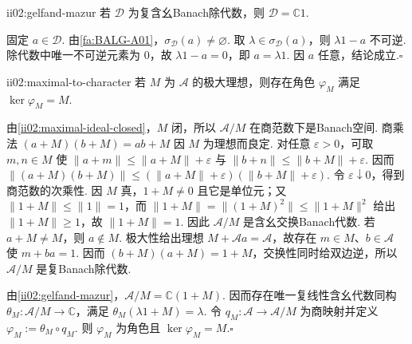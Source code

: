 \begin{FATheorem}{ii02:gelfand-mazur}
若 \(\displaystyle \mathcal D\) 为复含幺Banach除代数，则 \(\displaystyle\mathcal D=\mathbb C1\).
\end{FATheorem}

\begin{FAProof}
固定 \(\displaystyle a\in\mathcal D\). 由\autoref{fa:BALG-A01}，\(\displaystyle\sigma_{\mathcal D}(a)\neq\varnothing\). 取 \(\displaystyle\lambda\in\sigma_{\mathcal D}(a)\)，则 \(\displaystyle\lambda1-a\) 不可逆. 除代数中唯一不可逆元素为 \(\displaystyle0\)，故 \(\displaystyle\lambda1-a=0\)，即 \(\displaystyle a=\lambda1\). 因 \(\displaystyle a\) 任意，结论成立.\hfill\(\square\)
\end{FAProof}

\begin{FAProposition}[B][极大理想产生角色]{ii02:maximal-to-character}
若 \(\displaystyle M\) 为 \(\displaystyle\mathcal A\) 的极大理想，则存在角色 \(\displaystyle\varphi_M\) 满足 \(\displaystyle\ker\varphi_M=M\).
\end{FAProposition}

\begin{FAProof}
由\autoref{ii02:maximal-ideal-closed}，\(\displaystyle M\) 闭，所以 \(\displaystyle\mathcal A/M\) 在商范数下是Banach空间. 商乘法 \(\displaystyle(a+M)(b+M)=ab+M\) 因 \(\displaystyle M\) 为理想而良定. 对任意 \(\displaystyle\varepsilon>0\)，可取 \(\displaystyle m,n\in M\) 使 \(\displaystyle\|a+m\|\leqslant\|a+M\|+\varepsilon\) 与 \(\displaystyle\|b+n\|\leqslant\|b+M\|+\varepsilon\). 因而
\(\displaystyle \|(a+M)(b+M)\| \leqslant (\|a+M\|+\varepsilon)(\|b+M\|+\varepsilon).\)
令 \(\displaystyle\varepsilon\downarrow0\)，得到商范数的次乘性. 因 \(\displaystyle M\) 真，\(\displaystyle1+M\neq0\) 且它是单位元；又 \(\displaystyle\|1+M\|\leqslant\|1\|=1\)，而 \(\displaystyle\|1+M\|=\|(1+M)^2\|\leqslant\|1+M\|^2\) 给出 \(\displaystyle\|1+M\|\geqslant1\)，故 \(\displaystyle\|1+M\|=1\). 因此 \(\displaystyle\mathcal A/M\) 是含幺交换Banach代数. 若 \(\displaystyle a+M\neq M\)，则 \(\displaystyle a\notin M\). 极大性给出理想 \(\displaystyle M+\mathcal Aa=\mathcal A\)，故存在 \(\displaystyle m\in M\)、\(\displaystyle b\in\mathcal A\) 使 \(\displaystyle m+ba=1\). 因而 \(\displaystyle(b+M)(a+M)=1+M\)，交换性同时给双边逆，所以 \(\displaystyle\mathcal A/M\) 是复Banach除代数.

由\autoref{ii02:gelfand-mazur}，\(\displaystyle\mathcal A/M=\mathbb C(1+M)\). 因而存在唯一复线性含幺代数同构 \(\displaystyle\theta_M:\mathcal A/M\to\mathbb C\)，满足 \(\displaystyle\theta_M(\lambda1+M)=\lambda\). 令 \(\displaystyle q_M:\mathcal A\to\mathcal A/M\) 为商映射并定义 \(\displaystyle\varphi_M:=\theta_M\circ q_M\). 则 \(\displaystyle\varphi_M\) 为角色且 \(\displaystyle\ker\varphi_M=M\).\hfill\(\square\)
\end{FAProof}

